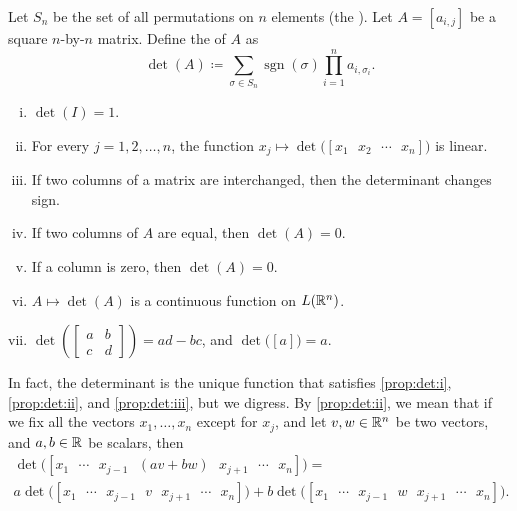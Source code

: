 Let $S_n$  be the set of all permutations on $n$ elements (the
\emph{}).
Let $A= [a_{i,j}]$ be a square $n$-by-$n$ matrix.
Define the \emph{} of $A$ as
\begin{equation*}
\det(A) \coloneqq 
\sum_{\sigma \in S_n}
\operatorname{sgn} (\sigma) \prod_{i=1}^n a_{i,\sigma_i} .
\end{equation*}

\begin{prop}
\pagebreak[0]
\leavevmode
\begin{enumerate}[(i)]
\item \label{prop:det:i} $\det(I) = 1$.
\item \label{prop:det:ii} For every $j=1,2,\ldots,n$, the function $x_j
\mapsto \det\bigl([x_1 ~~~ x_2 ~~~ \cdots ~~~ x_n ]\bigr)$
is linear.
\item \label{prop:det:iii} If two columns of a matrix are interchanged, then the determinant changes
sign.
\item \label{prop:det:iv} If two columns of $A$ are equal, then $\det(A) = 0$.
\item \label{prop:det:v} If a column is zero, then $\det(A) = 0$.
\item \label{prop:det:vi} $A \mapsto \det(A)$ is a continuous function on
$L({\mathbb{R}}^n)$.
\item \label{prop:det:vii} $\det\left( \left[\begin{smallmatrix} a & b \\ c
&d \end{smallmatrix}\right] \right)
= ad-bc$, and $\det \bigl( [a] \bigr) = a$.
\end{enumerate}
\end{prop}

In fact, the determinant is the unique function that satisfies
\ref{prop:det:i},
\ref{prop:det:ii}, and
\ref{prop:det:iii},
but we digress.
By \ref{prop:det:ii}, we mean that if we fix all the vectors
$x_1,\ldots,x_n$ except for $x_j$, and let
$v,w \in {\mathbb{R}}^n$ be two vectors,
and $a,b \in {\mathbb{R}}$ be scalars, then
\begin{multline*}
\det\bigl([x_1 ~~~ \cdots ~~~ x_{j-1} ~~~ (av+bw) ~~~ x_{j+1} ~~~
\cdots ~~~ x_n]\bigr) =
\\
a \det\bigl([x_1 ~~~ \cdots ~~~ x_{j-1} ~~~ v ~~~ x_{j+1} ~~~
\cdots ~~~ x_n]\bigr)
+
b
\det\bigl([x_1 ~~~ \cdots ~~~ x_{j-1} ~~~ w ~~~ x_{j+1} ~~~ \cdots
~~~ x_n]\bigr) .
\end{multline*}

